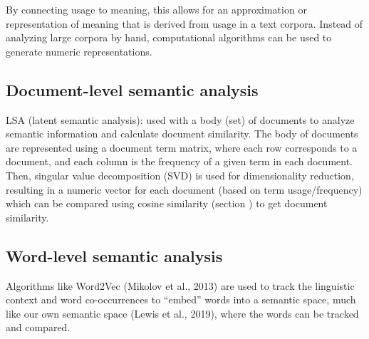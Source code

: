 By connecting usage to meaning, this allows for an approximation or representation of meaning that is derived from usage in a text corpora. Instead of analyzing large corpora by hand, computational algorithms can be used to generate numeric representations.

\subsection{Document-level semantic analysis}

LSA (latent semantic analysis): used with a body (set) of documents to analyze semantic information and calculate document similarity. The body of documents are represented using a document term matrix, where each row corresponds to a document, and each column is the frequency of a given term in each document. Then, singular value decomposition (SVD) is used for dimensionality reduction, resulting in a numeric vector for each document (based on term usage/frequency) which can be compared using cosine similarity (section ) to get document similarity.

\subsection{Word-level semantic analysis}

Algorithms like Word2Vec (Mikolov et al., 2013) are used to track the linguistic context and word co-occurrences to ``embed'' words into a semantic space, much like our own semantic space (Lewis et al., 2019), where the words can be tracked and compared. 

